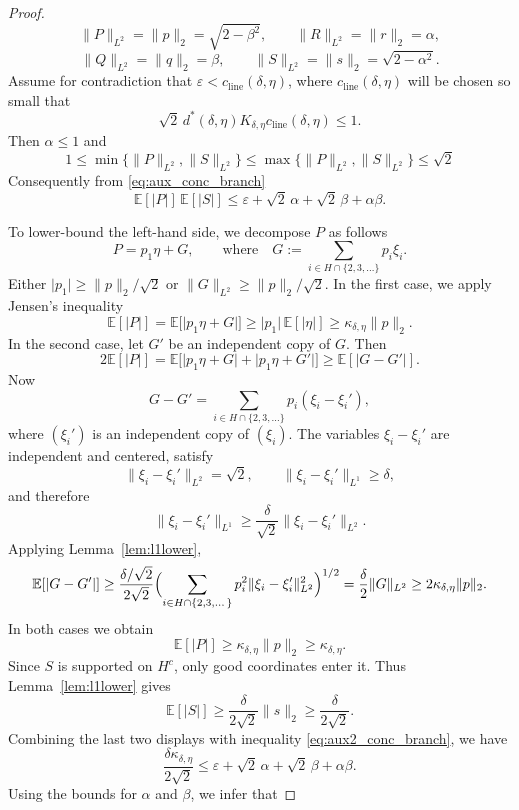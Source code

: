 \documentclass[11pt]{amsart}
\numberwithin{equation}{section}
\theoremstyle{definition}
\theoremstyle{remark}
\newcommand{\E}{\mathbb E}
\newcommand{\eps}{\varepsilon}
\newcommand{\abs}[1]{\lvert #1 \rvert}
\newcommand{\norm}[1]{\lVert #1 \rVert}
\begin{document}
\begin{proof}
	\[
	\norm{P}_{L^2}=\norm{p}_2=\sqrt{2-\beta^2},
	\qquad
	\norm{R}_{L^2}=\norm{r}_2=\alpha,
	\]
	\[
	\norm{Q}_{L^2}=\norm{q}_2=\beta,
	\qquad
	\norm{S}_{L^2}=\norm{s}_2=\sqrt{2-\alpha^2}.
	\]
	Assume for contradiction that $\eps<c_{\mathrm{line}}(\delta,\eta)$, where
	$c_{\mathrm{line}}(\delta,\eta)$ will be chosen so small that
	\[
	\sqrt2\,d^*(\delta,\eta)K_{\delta,\eta}c_{\mathrm{line}}(\delta,\eta)\le1.
	\]
	Then $\alpha\le1$ and
	\[
    1\le \min\{\|P\|_{L^2},\|S\|_{L^2}\}\le \max\{\|P\|_{L^2},\|S\|_{L^2}\} 
	\le \sqrt{2}
	\]
	Consequently from \eqref{eq:aux_conc_branch}
	\begin{equation}
    \label{eq:aux2_conc_branch}
	\E[\abs{P}]\,\E[\abs{S}]
	\le
	\eps+\sqrt2\,\alpha+\sqrt2\,\beta+\alpha\beta.
	\end{equation}
	
To lower-bound the left-hand side, we decompose $P$ as follows
	\[
	P=p_1\eta+G,
	\qquad \text{where} \quad 
	G:=\sum_{i\in H\cap\{2,3,\dots\}} p_i\xi_i.
	\]
	Either $\abs{p_1}\ge \norm{p}_2/\sqrt2$ or $\norm{G}_{L^2}\ge \norm{p}_2/\sqrt2$.
	In the first case, we apply Jensen's inequality
	\[
	\E[\abs{P}]
	=\E\bigl[\abs{p_1\eta+G}\bigr]
	\ge
	\abs{p_1}\,\E[\abs{\eta}]
	\ge
	\kappa_{\delta,\eta}\norm{p}_2.
	\]
	In the second case, let $G'$ be an independent copy of $G$.  Then
	\[
	2\E[\abs{P}]
	=\E\bigl[\abs{p_1\eta+G}+\abs{p_1\eta+G'}\bigr]
	\ge \E[\abs{G-G'}].
	\]
	Now
	\[
	G-G'
	=
	\sum_{i\in H\cap\{2,3,\dots\}} p_i(\xi_i-\xi_i'),
	\]
	where $(\xi_i')$ is an independent copy of $(\xi_i)$.  The variables
	$\xi_i-\xi_i'$ are independent and centered, satisfy
	\[
	\norm{\xi_i-\xi_i'}_{L^2}=\sqrt2,
	\qquad
	\norm{\xi_i-\xi_i'}_{L^1}\ge \delta,
	\]
	and therefore
	\[
	\norm{\xi_i-\xi_i'}_{L^1}
	\ge \frac{\delta}{\sqrt2}\norm{\xi_i-\xi_i'}_{L^2}.
	\]
	Applying Lemma~\ref{lem:l1lower},
	\[
	\E[\abs{G-G'}]
	\ge
	\frac{\delta/\sqrt2}{2\sqrt2}
	\Bigl(\sum_{i\in H\cap\{2,3,\dots\}} p_i^2
	\norm{\xi_i-\xi_i'}_{L^2}^2\Bigr)^{1/2}
	=\frac{\delta}{2}\norm{G}_{L^2}
	\ge 2\kappa_{\delta,\eta}\norm{p}_2.
	\]
	In both cases we obtain
	\[
	\E[\abs{P}]
	\ge \kappa_{\delta,\eta}\norm{p}_2
	\ge \kappa_{\delta,\eta}.
	\]
	Since $S$ is supported on $H^c$, only good coordinates enter it.  Thus
	Lemma~\ref{lem:l1lower} gives
	\[
	\E[\abs{S}]
	\ge \frac{\delta}{2\sqrt2}\norm{s}_2
	\ge \frac{\delta}{2\sqrt2}.
	\]
	Combining the last two displays with inequality \ref{eq:aux2_conc_branch}, we have
	\[
	\frac{\delta\kappa_{\delta,\eta}}{2\sqrt2}
	\le
	\eps+\sqrt2\,\alpha+\sqrt2\,\beta+\alpha\beta.
	\]
	Using the bounds for $\alpha$ and $\beta$, we infer that

\end{proof}
\end{document}
